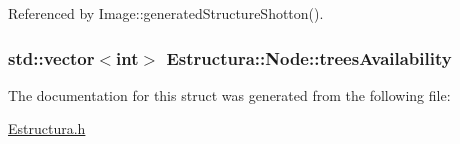 Referenced by Image\+::generated\+Structure\+Shotton().

\subsubsection[{\texorpdfstring{trees\+Availability}{treesAvailability}}]{\setlength{\rightskip}{0pt plus 5cm}std\+::vector$<$int$>$ Estructura\+::\+Node\+::trees\+Availability}\hypertarget{structEstructura_1_1Node_aab4eb88cc631cf0829658ca0e7a313a4}{}\label{structEstructura_1_1Node_aab4eb88cc631cf0829658ca0e7a313a4}


The documentation for this struct was generated from the following file\+:\begin{DoxyCompactItemize}
\item 
\hyperlink{Estructura_8h}{Estructura.\+h}\end{DoxyCompactItemize}
